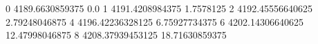 0 4189.6630859375 0.0
1 4191.4208984375 1.7578125
2 4192.45556640625 2.79248046875
4 4196.42236328125 6.75927734375
6 4202.14306640625 12.47998046875
8 4208.37939453125 18.71630859375
